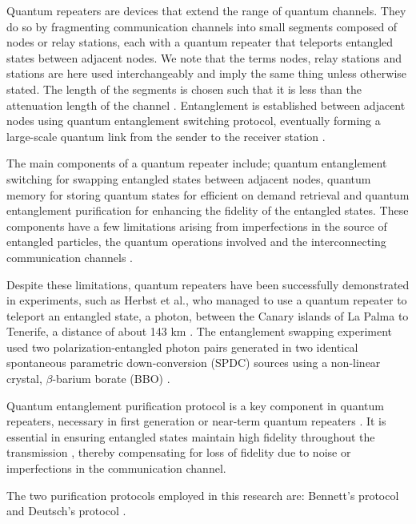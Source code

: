 \documentclass[11pt]{article}
\begin{document}
Quantum repeaters are devices that extend the range of quantum channels. They do so by fragmenting communication channels into small segments composed of nodes or relay stations, each with a quantum repeater that teleports entangled states between adjacent nodes. We note that the terms nodes, relay stations and stations are here used interchangeably and imply the same thing unless otherwise stated. The length of the segments is chosen such that it is less than the attenuation length of the channel \cite{Das_2021}. Entanglement is established between adjacent nodes using quantum entanglement switching protocol, eventually forming a large-scale quantum link from the sender to the receiver station \cite{Gisin_2007, Ruihong_2019}.

The main components of a quantum repeater include; quantum entanglement switching for swapping entangled states between adjacent nodes, quantum memory for storing quantum states for efficient on demand retrieval and quantum entanglement purification for enhancing the fidelity of the entangled states. These components have a few limitations arising from imperfections in the source of entangled particles, the quantum operations involved and the interconnecting communication channels \cite{Herbst_2015}.

Despite these limitations, quantum repeaters have been successfully demonstrated in experiments, such as Herbst et al., who managed to use a quantum repeater to teleport an entangled state, a photon, between the Canary islands of La Palma to Tenerife, a distance of about 143 km \cite{Herbst_2015}. The entanglement swapping experiment used two polarization-entangled photon pairs generated in two identical spontaneous parametric down-conversion (SPDC) sources using a non-linear crystal, $\beta$-barium borate (BBO) \cite{Herbst_2015}.

Quantum entanglement purification protocol is a key component in quantum repeaters, necessary in first generation or near-term quantum repeaters \cite{Muralidharan2016}. It is essential in ensuring entangled states maintain high fidelity throughout the transmission \cite{Bennett_1996}, thereby compensating for loss of fidelity due to noise or imperfections in the communication channel.

The two purification protocols employed in this research are: Bennett's protocol \cite{Bennett_1996} and Deutsch's protocol \cite{Deutsch_1996}.
\end{document}
